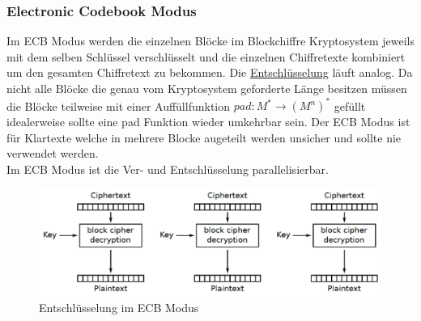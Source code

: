 \documentclass[a4paper,12pt,leqno]{article}
\begin{document}
\subsubsection{Electronic Codebook Modus}
Im ECB Modus werden die einzelnen Blöcke im Blockchiffre Kryptosystem jeweils mit dem selben Schlüssel verschlüsselt und die einzelnen Chiffretexte kombiniert um den gesamten Chiffretext zu bekommen. Die \hyperref[pic:ECBModus]{Entschlüsselung} läuft analog.
Da nicht alle Blöcke die genau vom Kryptosystem geforderte Länge besitzen müssen die Blöcke teilweise mit einer Auffüllfunktion $pad: M^*\rightarrow (M^n)^*$ gefüllt idealerweise sollte eine pad Funktion wieder umkehrbar sein.
Der ECB Modus ist für Klartexte welche in mehrere Blocke augeteilt werden unsicher und sollte nie verwendet werden.\\
Im ECB Modus ist die Ver- und Entschlüsselung parallelisierbar.

\begin{figure}
\centering
\includegraphics[scale=0.5]{Grafiken/ECBModus.png}
\caption{Entschlüsselung im ECB Modus}
\label{pic:ECBModus}
\end{figure}
\end{document}
